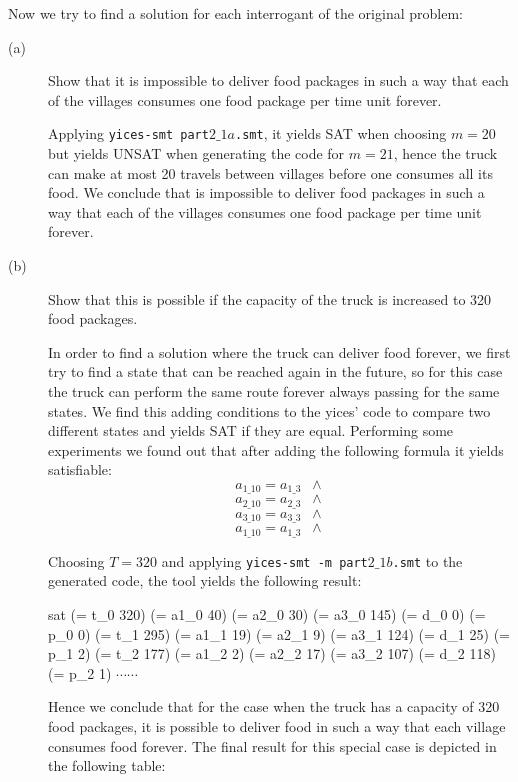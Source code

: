 Now we try to find a solution for each interrogant of the original problem:
\begin{description}
  \item[(a)] Show that it is impossible to deliver food packages in such a way that each of the villages consumes one food package per time unit forever.

  Applying {\tt yices-smt part$2\_1a$.smt}, it yields SAT when choosing $m=20$ but yields UNSAT when generating the code for $m=21$, hence the truck can make at most 20 travels between villages before one consumes all its food. We conclude that is impossible to deliver food packages in such a way that each of the villages consumes one food package per time unit forever.

  \item[(b)]  Show that this is possible if the capacity of the truck is increased to 320 food packages.

  In order to find a solution where the truck can deliver food forever, we first try to find a state that can be reached again in the future, so for this case the truck can perform the same route forever always passing for the same states. We find this adding conditions to the yices' code to compare two different states and yields SAT if they are equal. Performing some experiments we found out that after adding the following formula it yields satisfiable:
  \[a_{1\_10} = a_{1\_3} \;\;\wedge\]
  \[a_{2\_10} = a_{2\_3} \;\;\wedge\]
  \[a_{3\_10} = a_{3\_3} \;\;\wedge\]
  \[a_{1\_10} = a_{1\_3} \;\;\wedge\]

  Choosing $T = 320$ and applying {\tt yices-smt -m part$2\_1b$.smt} to the generated code, the tool yields the following result:

  \selectfont
  {\footnotesize
  \noindent

sat\break
(= t\_0 320)\break
(= a1\_0 40)\break
(= a2\_0 30)\break
(= a3\_0 145)\break
(= d\_0 0)\break
(= p\_0 0)\break
(= t\_1 295)\break
(= a1\_1 19)\break
(= a2\_1 9)\break
(= a3\_1 124)\break
(= d\_1 25)\break
(= p\_1 2)\break
(= t\_2 177)\break
(= a1\_2 2)\break
(= a2\_2 17)\break
(= a3\_2 107)\break
(= d\_2 118)\break
(= p\_2 1)\break
$\cdots \cdots$
  }
  \selectfont
  \vspace{3mm}

  Hence we conclude that for the case when the truck has a capacity of 320 food packages, it is possible to deliver food in such a way that each village consumes food forever. The final result for this special case is depicted in the following table:


\end{description}
